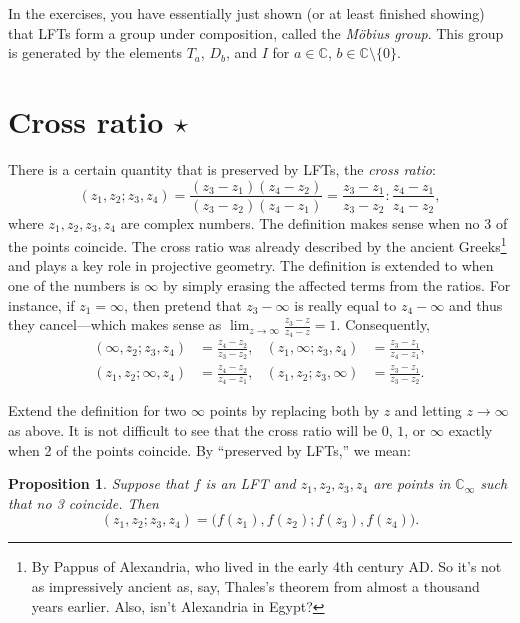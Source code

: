 \documentclass[12pt,openany]{book}
\newcommand{\glsadd}[2][]{}
\newcommand{\C}{{\mathbb{C}}}
\newcommand{\myindex}[1]{#1\index{#1}}
\newcommand{\myquote}[1]{``#1''}
\theoremstyle{plain}
\newtheorem{prop}[thm]{Proposition}
\theoremstyle{remark}
\theoremstyle{definition}
\theoremstyle{exercise}
\theoremstyle{example}
\begin{document}
In the exercises, you have essentially just shown (or at least finished
showing) that LFTs form a group under composition,
called the \emph{\myindex{M\"obius group}}.
This group is generated by the elements
$T_a$, $D_b$, and $I$ for $a\in \C$, $b \in \C \setminus \{ 0 \}$.


\section{Cross ratio \texorpdfstring{$\star$}{*}}

There is a certain quantity that is preserved by LFTs, the
\emph{\myindex{cross ratio}}:
\glsadd{not:crossratio}%
\begin{equation*}
(z_1,z_2;z_3,z_4)
=
\frac{(z_3-z_1)(z_4-z_2)}{(z_3-z_2)(z_4-z_1)}
=
\frac{z_3-z_1}{z_3-z_2} : 
\frac{z_4-z_1}{z_4-z_2} ,
\end{equation*}
where $z_1,z_2,z_3,z_4$ are complex numbers.
The definition makes sense when no 3 of the points coincide.
The cross ratio
was already described by the ancient Greeks\footnote{By
Pappus of Alexandria, who
lived in the early 4th century AD\@.  So it's not as impressively ancient
as, say,
Thales's theorem from almost a thousand years earlier.  Also, isn't
Alexandria in Egypt?}
and plays a key role in projective geometry.
The definition is extended to when one of the numbers is $\infty$ by simply
erasing the affected terms from the ratios.  For instance, if $z_1=\infty$,
then pretend that $z_3-\infty$
is really equal to $z_4-\infty$ and
thus they cancel---which makes sense as $\lim_{z\to\infty} \frac{z_3-z}{z_4-z} = 1$.
Consequently,
\begin{align*}
(\infty,z_2;z_3,z_4)
& =
\frac{z_4-z_2}{z_3-z_2}
,
&
(z_1,\infty;z_3,z_4)
& =
\frac{z_3-z_1}{z_4-z_1}
,
\\
(z_1,z_2;\infty,z_4)
& =
\frac{z_4-z_2}{z_4-z_1}
,
& 
(z_1,z_2;z_3,\infty)
& =
\frac{z_3-z_1}{z_3-z_2} .
\end{align*}

Extend the definition for two $\infty$ points by replacing
both by $z$ and letting $z \to \infty$ as above.
It is not difficult to see 
that the cross ratio will be $0$, $1$, or $\infty$
exactly when 2 of the points coincide.
By \myquote{preserved by LFTs,} we mean:

\begin{prop} \label{prop:crossratioinvariant}
Suppose that $f$ is an LFT and $z_1,z_2,z_3,z_4$ are points in
$\C_\infty$ such that no 3 coincide.  Then
\begin{equation*}
(z_1,z_2;z_3,z_4) =
\bigl(f(z_1),f(z_2);f(z_3),f(z_4)\bigr) .
\end{equation*}
\end{prop}
\end{document}
